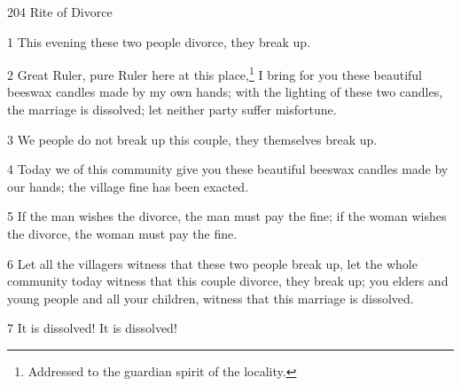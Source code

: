 
204 Rite of Divorce

1 This evening these two people divorce, they break up.

2 Great Ruler, pure Ruler here at this place,\footnote{Addressed to the guardian spirit of the locality.} I bring for you these beautiful
beeswax candles made by my own hands; with the lighting of these two candles, the
marriage is dissolved; let neither party suffer misfortune.

3 We people do not break up this couple, they themselves break up.

4 Today we of this community give you these beautiful beeswax candles made by our
hands; the village fine has been exacted.

5 If the man wishes the divorce, the man must pay the fine; if the woman wishes
the divorce, the woman must pay the fine.

6 Let all the villagers witness that these two people break up, let the whole community
today witness that this couple divorce, they break up; you elders and young people
and all your children, witness that this marriage is dissolved.

7 It is dissolved! It is dissolved!

